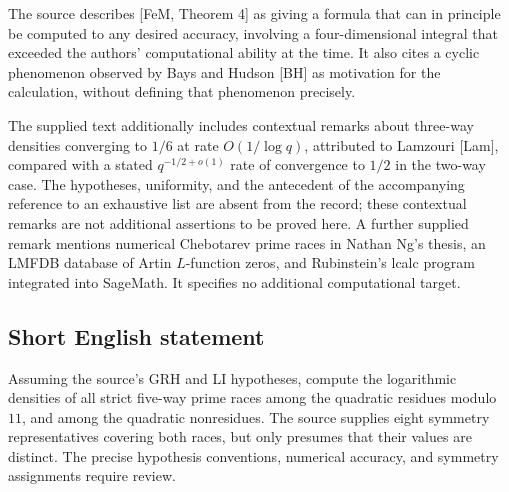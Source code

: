 \documentclass[11pt]{article}
\begin{document}
The source describes [FeM, Theorem 4] as giving a formula that can in principle be computed to any desired accuracy, involving a four-dimensional integral that exceeded the authors' computational ability at the time. It also cites a cyclic phenomenon observed by Bays and Hudson [BH] as motivation for the calculation, without defining that phenomenon precisely.

The supplied text additionally includes contextual remarks about three-way densities converging to \(1/6\) at rate \(O(1/\log q)\), attributed to Lamzouri [Lam], compared with a stated \(q^{-1/2+o(1)}\) rate of convergence to \(1/2\) in the two-way case. The hypotheses, uniformity, and the antecedent of the accompanying reference to an exhaustive list are absent from the record; these contextual remarks are not additional assertions to be proved here. A further supplied remark mentions numerical Chebotarev prime races in Nathan Ng's thesis, an LMFDB database of Artin \(L\)-function zeros, and Rubinstein's lcalc program integrated into SageMath. It specifies no additional computational target.
\subsection{Short English statement}
Assuming the source's GRH and LI hypotheses, compute the logarithmic densities of all strict five-way prime races among the quadratic residues modulo \(11\), and among the quadratic nonresidues. The source supplies eight symmetry representatives covering both races, but only presumes that their values are distinct. The precise hypothesis conventions, numerical accuracy, and symmetry assignments require review.
\end{document}
